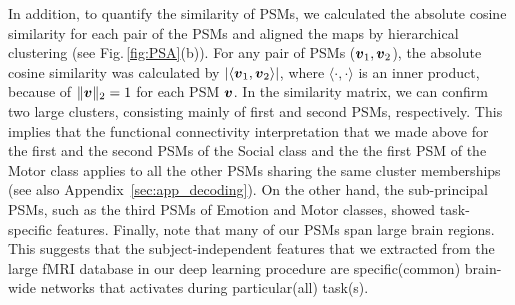 %
In addition, to quantify the similarity of PSMs, we calculated the
absolute cosine similarity for each pair of the PSMs and aligned the
maps by hierarchical clustering (see Fig.\,\ref{fig:PSA}(b)).
%
For any pair of PSMs ($\mbox{\boldmath $v$}_1, \mbox{\boldmath $v$}_2$), the absolute cosine similarity was calculated by $\left|\langle\mbox{\boldmath $v$}_1, \mbox{\boldmath $v$}_2\rangle\right|$, where $\langle\cdot, \cdot\rangle$ is an inner product, because of $\|\mbox{\boldmath $v$}\|_2 = 1$ for each PSM $\mbox{\boldmath $v$}$.
%
In the similarity matrix, we can confirm two large clusters, consisting mainly of first and second PSMs, respectively.
%
This implies that the functional connectivity interpretation that we
made above for the first and the second PSMs of the Social class and the
the first PSM of the Motor class applies to all the other PSMs sharing
the same cluster memberships (see also Appendix~\ref{sec:app_decoding}).
%
On the other hand, the sub-principal PSMs, such as the third PSMs of Emotion and Motor classes, showed task-specific features.
%
Finally, note that many of our PSMs span large brain regions.
%
This suggests that the subject-independent features that we extracted from the large fMRI database in our deep learning procedure are specific(common) brain-wide networks that activates during particular(all) task(s).
%
